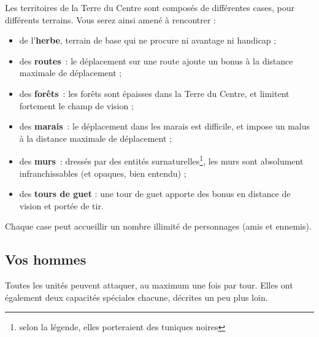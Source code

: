 Les territoires de la Terre du Centre sont composés de différentes
cases, pour différents terrains. Vous serez ainsi amené à rencontrer :

\begin{itemize}
  \item de l'\textbf{herbe}, terrain de base qui ne procure ni
    avantage ni handicap ;
  \item des \textbf{routes}~: le déplacement sur une route ajoute un
    bonus à la distance maximale de déplacement ;
  \item des \textbf{forêts}~: les forêts sont épaisses dans la Terre du
    Centre, et limitent fortement le champ de vision ;
  \item des \textbf{marais}~: le déplacement dans les marais est
    difficile, et impose un malus à la distance maximale de
    déplacement ;
  \item des \textbf{murs}~: dressés par des entités
    surnaturelles\footnote{selon la légende, elles porteraient des
      tuniques noires}, les murs sont absolument infranchissables (et
    opaques, bien entendu) ;
  \item des \textbf{tours de guet} : une tour de guet apporte des
    bonus en distance de vision et portée de tir.
\end{itemize}

Chaque case peut accueillir un nombre illimité de personnages (amis et ennemis).

\subsection{Vos hommes}
\prolocitation{}

Toutes les unités peuvent attaquer, au maximum une fois par
tour. Elles ont également deux capacités spéciales chacune, décrites
un peu plus loin.

